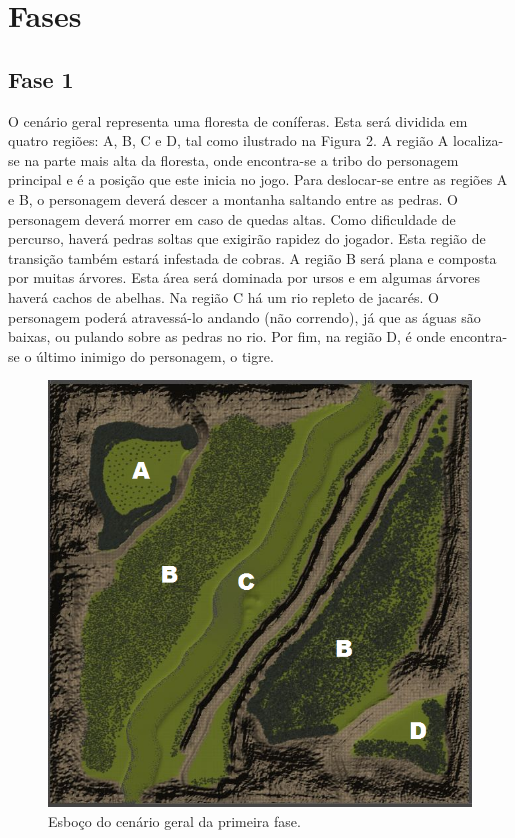 \section{Fases}
\subsection{Fase 1}
O cenário geral representa uma floresta de coníferas. Esta será dividida em quatro 
regiões: A, B, C e D, tal como ilustrado na Figura 2. A região A localiza-se na parte 
mais alta da floresta, onde encontra-se a tribo do personagem principal e é a posição 
que este inicia no jogo. Para deslocar-se entre as regiões A e B, o personagem deverá 
descer a montanha saltando entre as pedras. O personagem deverá morrer em caso de 
quedas altas. Como dificuldade de percurso, haverá pedras soltas que exigirão rapidez 
do jogador. Esta região de transição também estará infestada de cobras. A região B 
será plana e composta por muitas árvores. Esta área será dominada por ursos e em 
algumas árvores haverá cachos de abelhas. Na região C há um rio repleto de jacarés. 
O personagem poderá atravessá-lo andando (não correndo), já que as águas são baixas, 
ou pulando sobre as pedras no rio. Por fim, na região D, é onde encontra-se o último 
inimigo do personagem, o tigre.

\begin{figure}[!ht]
 \centering
 \includegraphics[scale=1]{cenario01.png}
 \caption{Esboço do cenário geral da primeira fase.}
 \label{img:cenario01}
\end{figure}